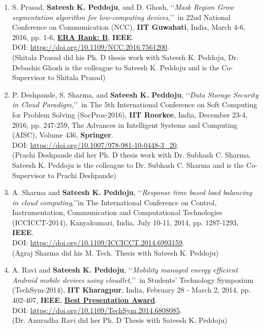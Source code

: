 \begin{enumerate}
	
	\item
	S. Prasad, \textbf{Sateesh K. Peddoju}, and D. Ghosh, \lq\lq \textit{Mask Region Grow segmentation algorithm for low-computing devices},\rq\rq\, in 22nd National Conference on Communication (NCC), \textbf{IIT Guwahati}, India, March 4-6, 2016, pp. 1-6, \underline{\textbf{ERA Rank: B}}, \textbf{IEEE}. \\DOI: \url{https://doi.org/10.1109/NCC.2016.7561200}. \\(Shitala Prasad did his Ph. D thesis work with Sateesh K. Peddoju, Dr. Debashis Ghosh is the colleague to Sateesh K. Peddoju and is the Co-Supervisor to Shitala Prasad)

	
	\item
	P. Deshpande, S. Sharma, and \textbf{Sateesh K. Peddoju}, \lq\lq \textit{Data Storage Security in Cloud Paradigm},\rq\rq\, in The 5th International Conference on Soft Computing for Problem Solving (SocPros-2016), \textbf{IIT Roorkee}, India, December 23-4, 2016, pp. 247-259, The Advances in Intelligent Systems and Computing (AISC), Volume 436,  \textbf{Springer}. \\DOI:
\url{https://doi.org/10.1007/978-981-10-0448-3_20}. \\(Prachi Deshpande did her Ph. D thesis work with Dr. Subhash C. Sharma. Sateesh K. Peddoju is the colleague to Dr. Subhash C. Sharma and is the Co-Supervisor to Prachi Deshpande)

	
	\item
	A. Sharma and \textbf{Sateesh K. Peddoju}, \lq\lq \textit{Response time based load balancing in cloud computing},\rq\rq in The International Conference on Control, Instrumentation, Communication and Computational Technologies (ICCICCT-2014), Kanyakumari, India, July 10-11, 2014, pp. 1287-1293, \textbf{IEEE}. \\DOI: \url{https://doi.org/10.1109/ICCICCT.2014.6993159}. \\(Agraj Sharma did his M. Tech. Thesis with Sateesh K. Peddoju)

	
	\item
	A. Ravi and \textbf{Sateesh K. Peddoju}, \lq\lq \textit{Mobility managed energy efficient Android mobile devices using cloudlet},\rq\rq\, in Students' Technology Symposium (TechSym-2014), \textbf{IIT Kharagpur}, India, February 28 - March 2, 2014, pp. 402-407,  \textbf{IEEE}, \underline{\textbf{Best Presentation Award}}. \\DOI: \url{https://doi.org/10.1109/TechSym.2014.6808085}. \\(Dr. Anuradha Ravi did her Ph. D Thesis with Sateesh K. Peddoju)


\end{enumerate}
